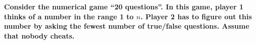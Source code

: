 \textbf{Consider the numerical game ``20 questions''. In this game, player 1 thinks of a number in the range 1 to $n$. Player 2 has to figure out this number by asking the fewest number of true/false questions. Assume that nobody cheats.}\vspace{.2cm}

\textcolor{bibi}{}
\begin{quote}
\end{quote}